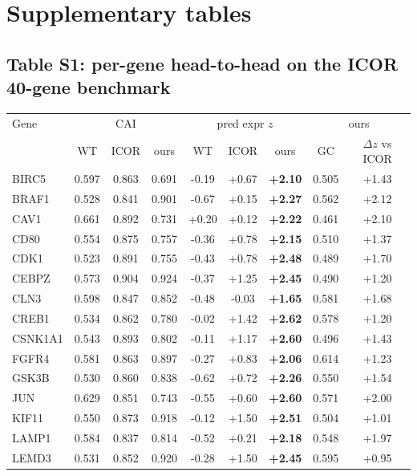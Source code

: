 \section{Supplementary tables}
\subsection{Table S1: per-gene head-to-head on the ICOR 40-gene benchmark}
\begin{center}\small\begin{tabular}{l|ccc|ccc|cc}\hline\hline
Gene & \multicolumn{3}{c|}{CAI} & \multicolumn{3}{c|}{pred expr $z$} & \multicolumn{2}{c}{ours}\\
 & WT & ICOR & ours & WT & ICOR & ours & GC & $\Delta z$ vs ICOR\\\hline
BIRC5 & 0.597 & 0.863 & 0.691 & -0.19 & +0.67 & \textbf{+2.10} & 0.505 & +1.43\\
BRAF1 & 0.528 & 0.841 & 0.901 & -0.67 & +0.15 & \textbf{+2.27} & 0.562 & +2.12\\
CAV1 & 0.661 & 0.892 & 0.731 & +0.20 & +0.12 & \textbf{+2.22} & 0.461 & +2.10\\
CD80 & 0.554 & 0.875 & 0.757 & -0.36 & +0.78 & \textbf{+2.15} & 0.510 & +1.37\\
CDK1 & 0.523 & 0.891 & 0.755 & -0.43 & +0.78 & \textbf{+2.48} & 0.489 & +1.70\\
CEBPZ & 0.573 & 0.904 & 0.924 & -0.37 & +1.25 & \textbf{+2.45} & 0.490 & +1.20\\
CLN3 & 0.598 & 0.847 & 0.852 & -0.48 & -0.03 & \textbf{+1.65} & 0.581 & +1.68\\
CREB1 & 0.534 & 0.862 & 0.780 & -0.02 & +1.42 & \textbf{+2.62} & 0.578 & +1.20\\
CSNK1A1 & 0.543 & 0.893 & 0.802 & -0.11 & +1.17 & \textbf{+2.60} & 0.496 & +1.43\\
FGFR4 & 0.581 & 0.863 & 0.897 & -0.27 & +0.83 & \textbf{+2.06} & 0.614 & +1.23\\
GSK3B & 0.530 & 0.860 & 0.838 & -0.62 & +0.72 & \textbf{+2.26} & 0.550 & +1.54\\
JUN & 0.629 & 0.851 & 0.743 & -0.55 & +0.60 & \textbf{+2.60} & 0.571 & +2.00\\
KIF11 & 0.550 & 0.873 & 0.918 & -0.12 & +1.50 & \textbf{+2.51} & 0.504 & +1.01\\
LAMP1 & 0.584 & 0.837 & 0.814 & -0.52 & +0.21 & \textbf{+2.18} & 0.548 & +1.97\\
LEMD3 & 0.531 & 0.852 & 0.920 & -0.28 & +1.50 & \textbf{+2.45} & 0.595 & +0.95\\

\end{tabular}
\end{center}
